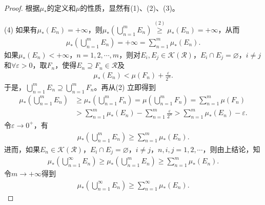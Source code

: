\documentclass[../../main.tex]{subfiles}%
\begin{document}
\begin{proof}
根据$\mu_*$的定义和$\mu$的性质，显然有(1)、(2)、(3)。

(4) 如果有$\mu_*(E_n)=+\infty$，则$\mu_*\left(\bigcup\limits_{n=1}^{m}E_n\right)\overset{(2)}{\geqslant} \mu_*(E_n)=+\infty$，从而
\begin{align*}
\mu_*\left(\bigcup\limits_{n=1}^{m}E_n\right)=+\infty = \sum\limits_{n=1}^{m}\mu_*(E_n).
\end{align*}
如果$\mu_*(E_n)<+\infty$，$n=1,2,\cdots,m$，则对$E_i,E_j\in\mathscr{K}(\mathscr{R})$，$E_i\cap E_j=\varnothing$，$i\neq j$和$\forall\varepsilon>0$，取$F_n$，使得$E_n\supseteq F_n\in\mathscr{R}$及
\begin{align*}
\mu_*(E_n) < \mu(F_n) + \frac{\varepsilon}{2^n}.
\end{align*}
于是，$\bigcup\limits_{n=1}^{m}E_n \supseteq \bigcup\limits_{n=1}^{m}F_n$。再从(2) 立即得到
\begin{align*}
\mu_*\left(\bigcup\limits_{n=1}^{m}E_n\right) &\geqslant \mu_*\left(\bigcup\limits_{n=1}^{m}F_n\right) = \mu\left(\bigcup\limits_{n=1}^{m}F_n\right) = \sum\limits_{n=1}^{m}\mu(F_n) \\
&> \sum\limits_{n=1}^{m}\mu_*(E_n) - \sum\limits_{n=1}^{m}\frac{\varepsilon}{2^n} > \sum\limits_{n=1}^{m}\mu_*(E_n) - \varepsilon.
\end{align*}
令$\varepsilon\to 0^+$，有
\begin{align*}
\mu_*\left(\bigcup\limits_{n=1}^{m}E_n\right)\geqslant \sum\limits_{n=1}^{m}\mu_*(E_n).
\end{align*}
进而，如果$E_n\in\mathscr{K}(\mathscr{R})$，$E_i\cap E_j=\varnothing$，$i\neq j$，$n,i,j=1,2,\cdots$，则由上结论，知
\begin{align*}
\mu_*\left(\bigcup\limits_{n=1}^{\infty}E_n\right)\geqslant \mu_*\left(\bigcup\limits_{n=1}^{m}E_n\right)\geqslant \sum\limits_{n=1}^{m}\mu_*(E_n).
\end{align*}
令$m\to+\infty$得到
\begin{align*}
\mu_*\left(\bigcup\limits_{n=1}^{\infty}E_n\right)\geqslant \sum\limits_{n=1}^{\infty}\mu_*(E_n).
\end{align*}


\end{proof}
\end{document}
